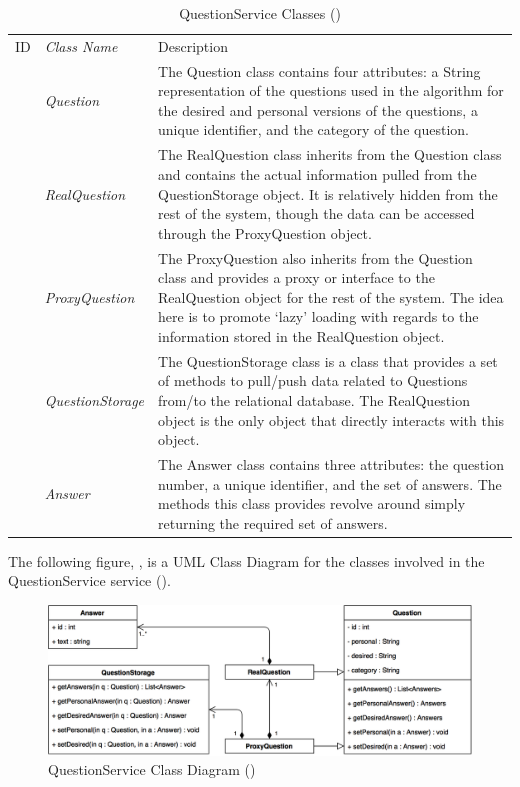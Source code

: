 \documentclass[12pt,letterpaper]{article}
\begin{document}
\begin{table}[H]
	\caption{QuestionService Classes ()} 
	\begin{tabu} to 
	    \tableheader{}ID & Class Name & Description \\
		 & Question & The Question class contains four attributes: a String representation of the questions used in the algorithm for the desired and personal versions of the questions, a unique identifier, and the category of the question. \\
		 & RealQuestion & The RealQuestion class inherits from the Question class and contains the actual information pulled from the QuestionStorage object. It is relatively hidden from the rest of the system, though the data can be accessed through the ProxyQuestion object.\\
		 & ProxyQuestion & The ProxyQuestion also inherits from the Question class and provides a proxy or interface to the RealQuestion object for the rest of the system. The idea here is to promote `lazy' loading with regards to the information stored in the RealQuestion object.\\
		 & QuestionStorage & The QuestionStorage class is a class that provides a set of methods to pull/push data related to Questions from/to the relational database. The RealQuestion object is the only object that directly interacts with this object.\\
		 & Answer & The Answer class contains three attributes: the question number, a unique identifier, and the set of answers. The methods this class provides revolve around simply returning the required set of answers.\\
	\end{tabu}
\end{table}

The following figure, , is a UML Class Diagram for the classes involved in the QuestionService service ().

\begin{figure}[H]
	\centering{}
	\includegraphics[scale=0.32]{imgs/d3/interfaces/question.png}
	\caption{QuestionService Class Diagram ()}
\end{figure}
\end{document}

